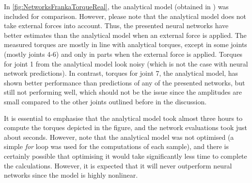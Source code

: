 In \cref{fig:NetworksFrankaTorqueReal}, the analytical model (obtained in \cite{Gaz2019}) was included for comparison. However, please note that the analytical model does not take external forces into account. Thus, the presented neural networks have better estimates than the analytical model when an external force is applied. The measured torques are mostly in line with analytical torques, except in some joints (mostly joints 4-6) and only in parts when the external force is applied. Torques for joint 1 from the analytical model look noisy (which is not the case with neural network predictions). In contrast, torques for joint 7, the analytical model, has shown better performance than predictions of any of the presented networks, but still not performing well, which should not be the issue since the amplitudes are small compared to the other joints outlined before in the discussion. 

It is essential to emphasise that the analytical model took almost three hours to compute the torques depicted in the figure, and the network evaluations took just about seconds. However, note that the analytical model was not optimised (a simple \emph{for} loop was used for the computations of each sample), and there is certainly possible that optimising it would take significantly less time to complete the calculations. However, it is expected that it will never outperform neural networks since the model is highly nonlinear.

